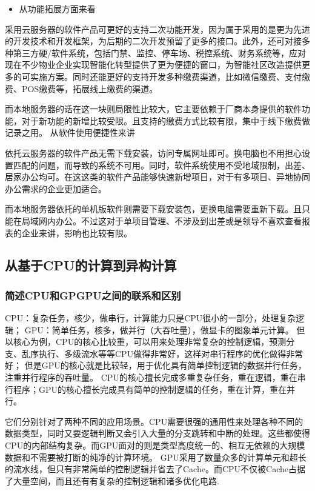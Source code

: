 \documentclass[UTF8,a4paper,AutoFakeBold,AutoFakeSlant]{ctexart}
\begin{document}
\begin{itemize}
  \item 从功能拓展方面来看
\end{itemize}

采用云服务器的软件产品可更好的支持二次功能开发，因为属于采用的是更为先进的开发技术和开发框架，为后期的二次开发预留了更多的接口。此外，还可对接多种第三方硬/软件系统，包括门禁、监控、停车场、税控系统、财务系统等，应对现在不少物业企业实现智能化转型提供了更为便捷的窗口，为智能社区改造提供更多的可实施方案。同时还能更好的支持开发多种缴费渠道，比如微信缴费、支付缴费、POS缴费等，拓展线上缴费的渠道。

而本地服务器的话在这一块则局限性比较大，它主要依赖于厂商本身提供的软件功能，对于新功能的新增比较受限。且支持的缴费方式比较有限，集中于线下缴费做记录之用。
从软件使用便捷性来讲

依托云服务器的软件产品无需下载安装，访问专属网址即可。换电脑也不用担心设置匹配的问题，而导致的系统不可用。同时，软件系统使用不受地域限制，出差、居家办公均可。在这这类的软件产品能够快速新增项目，对于有多项目、异地协同办公需求的企业更加适合。

而本地服务器依托的单机版软件则需要下载安装包，更换电脑需要重新下载。且只能在局域网内办公。不过这对于单项目管理、不涉及到出差或是领导不喜欢查看报表的企业来讲，影响也比较有限。


\subsection{从基于CPU的计算到异构计算}


\subsubsection{简述CPU和GPGPU之间的联系和区别}
CPU：复杂任务，核少，做串行，计算能力只是CPU很小的一部分，处理复杂逻辑； GPU：简单任务，核多，做并行（大吞吐量），做显卡的图象单元计算。
但以核心为例，CPU的核心比较重，可以用来处理非常复杂的控制逻辑，预测分支、乱序执行、多级流水等等CPU做得非常好，这样对串行程序的优化做得非常好；
但是GPU的核心就是比较轻，用于优化具有简单控制逻辑的数据并行任务，注重并行程序的吞吐量。
CPU的核心擅长完成多重复杂任务，重在逻辑，重在串行程序；GPU的核心擅长完成具有简单的控制逻辑的任务，重在计算，重在并行。

它们分别针对了两种不同的应用场景。CPU需要很强的通用性来处理各种不同的数据类型，同时又要逻辑判断又会引入大量的分支跳转和中断的处理。这些都使得CPU的内部结构复杂。而GPU面对的则是类型高度统一的、相互无依赖的大规模数据和不需要被打断的纯净的计算环境。
GPU采用了数量众多的计算单元和超长的流水线，但只有非常简单的控制逻辑并省去了Cache。而CPU不仅被Cache占据了大量空间，而且还有有复杂的控制逻辑和诸多优化电路.
\end{document}
